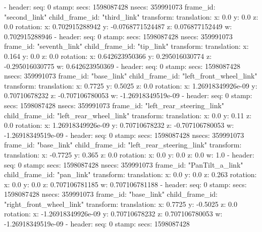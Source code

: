   - 
    header: 
      seq: 0
      stamp: 
        secs: 1598087428
        nsecs: 359991073
      frame_id: "second_link"
    child_frame_id: "third_link"
    transform: 
      translation: 
        x: 0.0
        y: 0.0
        z: 0.0
      rotation: 
        x: 0.702915288942
        y: -0.0768771524487
        z: 0.076877152449
        w: 0.702915288946
  - 
    header: 
      seq: 0
      stamp: 
        secs: 1598087428
        nsecs: 359991073
      frame_id: "seventh_link"
    child_frame_id: "tip_link"
    transform: 
      translation: 
        x: 0.164
        y: 0.0
        z: 0.0
      rotation: 
        x: 0.642623950366
        y: 0.295016030774
        z: -0.295016030775
        w: 0.642623950369
  - 
    header: 
      seq: 0
      stamp: 
        secs: 1598087428
        nsecs: 359991073
      frame_id: "base_link"
    child_frame_id: "left_front_wheel_link"
    transform: 
      translation: 
        x: 0.7725
        y: 0.5025
        z: 0.0
      rotation: 
        x: 1.26918349926e-09
        y: 0.70710678232
        z: -0.707106780053
        w: -1.26918349519e-09
  - 
    header: 
      seq: 0
      stamp: 
        secs: 1598087428
        nsecs: 359991073
      frame_id: "left_rear_steering_link"
    child_frame_id: "left_rear_wheel_link"
    transform: 
      translation: 
        x: 0.0
        y: 0.11
        z: 0.0
      rotation: 
        x: 1.26918349926e-09
        y: 0.70710678232
        z: -0.707106780053
        w: -1.26918349519e-09
  - 
    header: 
      seq: 0
      stamp: 
        secs: 1598087428
        nsecs: 359991073
      frame_id: "base_link"
    child_frame_id: "left_rear_steering_link"
    transform: 
      translation: 
        x: -0.7725
        y: 0.365
        z: 0.0
      rotation: 
        x: 0.0
        y: 0.0
        z: 0.0
        w: 1.0
  - 
    header: 
      seq: 0
      stamp: 
        secs: 1598087428
        nsecs: 359991073
      frame_id: "PanTilt_a_link"
    child_frame_id: "pan_link"
    transform: 
      translation: 
        x: 0.0
        y: 0.0
        z: 0.263
      rotation: 
        x: 0.0
        y: 0.0
        z: 0.707106781185
        w: 0.707106781188
  - 
    header: 
      seq: 0
      stamp: 
        secs: 1598087428
        nsecs: 359991073
      frame_id: "base_link"
    child_frame_id: "right_front_wheel_link"
    transform: 
      translation: 
        x: 0.7725
        y: -0.5025
        z: 0.0
      rotation: 
        x: -1.26918349926e-09
        y: 0.70710678232
        z: 0.707106780053
        w: -1.26918349519e-09
  - 
    header: 
      seq: 0
      stamp: 
        secs: 1598087428

